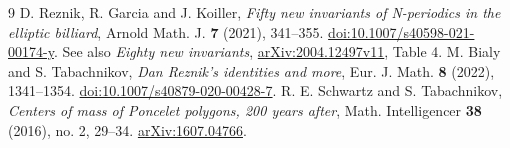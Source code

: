 \documentclass[11pt]{article}
\begin{document}
\begin{thebibliography}{9}
 D. Reznik, R. Garcia and J. Koiller,
\emph{Fifty new invariants of N-periodics in the elliptic billiard},
Arnold Math. J. \textbf{7} (2021), 341--355.
\href{https://doi.org/10.1007/s40598-021-00174-y}{doi:10.1007/s40598-021-00174-y}.
See also \emph{Eighty new invariants},
\href{https://arxiv.org/abs/2004.12497v11}{arXiv:2004.12497v11}, Table 4.
 M. Bialy and S. Tabachnikov,
\emph{Dan Reznik's identities and more},
Eur. J. Math. \textbf{8} (2022), 1341--1354.
\href{https://doi.org/10.1007/s40879-020-00428-7}{doi:10.1007/s40879-020-00428-7}.
 R. E. Schwartz and S. Tabachnikov,
\emph{Centers of mass of Poncelet polygons, 200 years after},
Math. Intelligencer \textbf{38} (2016), no. 2, 29--34.
\href{https://arxiv.org/abs/1607.04766}{arXiv:1607.04766}.
\end{thebibliography}
\end{document}
